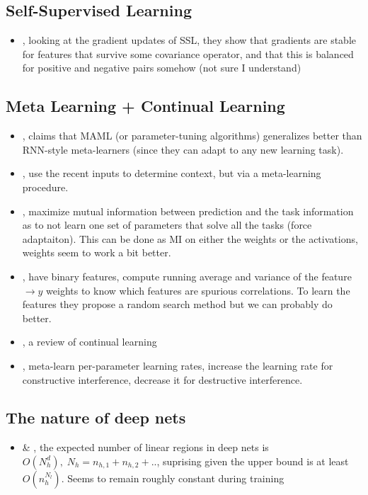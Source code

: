 \subsection{Self-Supervised Learning}
\begin{itemize}
  \item \citet{tian2020understanding}, looking at the gradient updates of SSL, they show that gradients are stable for features that survive some covariance operator, and that this is balanced for positive and negative pairs somehow (not sure I understand)
\end{itemize}


\subsection{Meta Learning + Continual Learning}
\begin{itemize}
  \item \citet{finn2017metalearning}, claims that MAML (or parameter-tuning algorithms) generalizes better than RNN-style meta-learners (since they can adapt to any new learning task).
  \item \citet{he2019task}, use the recent inputs to determine context, but via a meta-learning procedure.
  \item \citet{Yin2020Meta-Learning}, maximize mutual information between prediction and the task information as to not learn one set of parameters that solve all the tasks (force adaptaiton). This can be done as MI on either the weights or the activations, weights seem to work a bit better.
  \item \citet{javed2020learning}, have binary features, compute running average and variance of the feature $\to y$ weights to know which features are spurious correlations. To learn the features they propose a random search method but we can probably do better.
  \item \citet{hadsell2020embracing}, a review of continual learning
  \item \citet{gupta2020maml}, meta-learn per-parameter learning rates, increase the learning rate for constructive interference, decrease it for destructive interference.
\end{itemize}

\subsection{The nature of deep nets}
\begin{itemize}
  \item \citet{hanin2019complexity} \& \citet{hanin2019deep}, the expected number of linear regions in deep nets is $O(N_h^d),\;N_h=n_{h,1}+n_{h,2}+..$,  suprising given the upper bound is at least $O(n_h^{N_l})$. Seems to remain roughly constant during training
\end{itemize}


